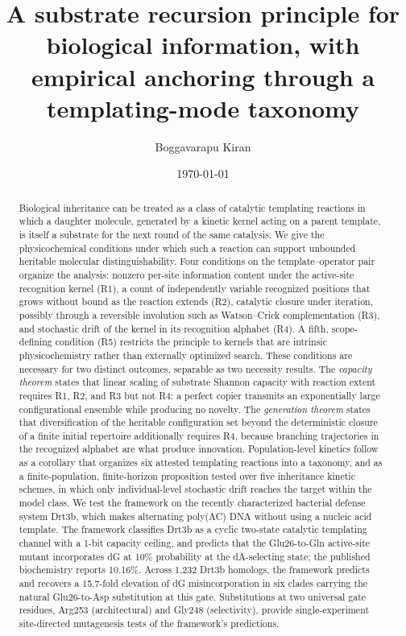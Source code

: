 \documentclass[aps,prx,reprint,amsmath,amssymb,floatfix,superscriptaddress,nofootinbib]{revtex4-2}
\theoremstyle{plain-thm}
\theoremstyle{definition-thm}
\begin{document}
\title{A substrate recursion principle for biological information, with empirical anchoring through a templating-mode taxonomy}

\author{Boggavarapu Kiran}

\date{\today}

\begin{abstract}
Biological inheritance can be treated as a class of catalytic templating reactions in which a daughter molecule, generated by a kinetic kernel acting on a parent template, is itself a substrate for the next round of the same catalysis. We give the physicochemical conditions under which such a reaction can support unbounded heritable molecular distinguishability. Four conditions on the template--operator pair organize the analysis: nonzero per-site information content under the active-site recognition kernel (R1), a count of independently variable recognized positions that grows without bound as the reaction extends (R2), catalytic closure under iteration, possibly through a reversible involution such as Watson--Crick complementation (R3), and stochastic drift of the kernel in its recognition alphabet (R4). A fifth, scope-defining condition (R5) restricts the principle to kernels that are intrinsic physicochemistry rather than externally optimized search. These conditions are necessary for two distinct outcomes, separable as two necessity results. The \emph{capacity theorem} states that linear scaling of substrate Shannon capacity with reaction extent requires R1, R2, and R3 but not R4: a perfect copier transmits an exponentially large configurational ensemble while producing no novelty. The \emph{generation theorem} states that diversification of the heritable configuration set beyond the deterministic closure of a finite initial repertoire additionally requires R4, because branching trajectories in the recognized alphabet are what produce innovation. Population-level kinetics follow as a corollary that organizes six attested templating reactions into a taxonomy, and as a finite-population, finite-horizon proposition tested over five inheritance kinetic schemes, in which only individual-level stochastic drift reaches the target within the model class. We test the framework on the recently characterized bacterial defense system Drt3b, which makes alternating poly(AC) DNA without using a nucleic acid template. The framework classifies Drt3b as a cyclic two-state catalytic templating channel with a 1-bit capacity ceiling, and predicts that the Glu26-to-Gln active-site mutant incorporates dG at 10\% probability at the dA-selecting state; the published biochemistry reports 10.16\%. Across 1{,}232 Drt3b homologs, the framework predicts and recovers a 15.7-fold elevation of dG misincorporation in six clades carrying the natural Glu26-to-Asp substitution at this gate. Substitutions at two universal gate residues, Arg253 (architectural) and Gly248 (selectivity), provide single-experiment site-directed mutagenesis tests of the framework's predictions.
\end{abstract}
\end{document}
